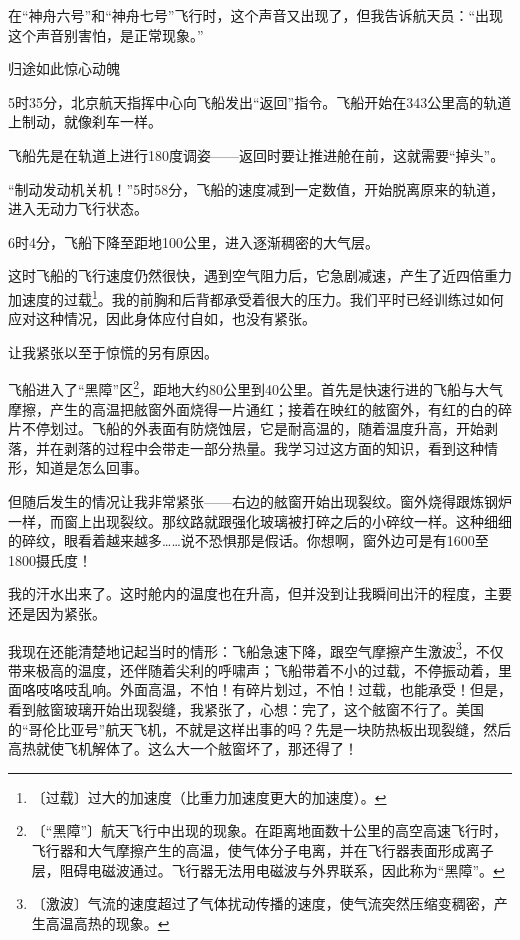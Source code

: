 \documentclass[12pt,UTF-8,openany]{ctexbook}
\begin{document}
\begin{large}
    在“神舟六号”和“神舟七号”飞行时，这个声音又出现了，但我告诉航天员：“出现这个声音别害怕，是正常现象。”
    
    归途如此惊心动魄
    
    5时35分，北京航天指挥中心向飞船发出“返回”指令。飞船开始在343公里高的轨道上制动，就像刹车一样。
    
    飞船先是在轨道上进行180度调姿——返回时要让推进舱在前，这就需要“掉头”。
    
    “制动发动机关机！”5时58分，飞船的速度减到一定数值，开始脱离原来的轨道，进入无动力飞行状态。
    
    6时4分，飞船下降至距地100公里，进入逐渐稠密的大气层。
    
    这时飞船的飞行速度仍然很快，遇到空气阻力后，它急剧减速，产生了近四倍重力加速度的过载\footnote{〔过载〕过大的加速度（比重力加速度更大的加速度）。}。我的前胸和后背都承受着很大的压力。我们平时已经训练过如何应对这种情况，因此身体应付自如，也没有紧张。
    
    让我紧张以至于惊慌的另有原因。
    
    飞船进入了“黑障”区\footnote{〔“黑障”〕航天飞行中出现的现象。在距离地面数十公里的高空高速飞行时，飞行器和大气摩擦产生的高温，使气体分子电离，并在飞行器表面形成离子层，阻碍电磁波通过。飞行器无法用电磁波与外界联系，因此称为“黑障”。}，距地大约80公里到40公里。首先是快速行进的飞船与大气摩擦，产生的高温把舷窗外面烧得一片通红；接着在映红的舷窗外，有红的白的碎片不停划过。飞船的外表面有防烧蚀层，它是耐高温的，随着温度升高，开始剥落，并在剥落的过程中会带走一部分热量。我学习过这方面的知识，看到这种情形，知道是怎么回事。
    
    但随后发生的情况让我非常紧张——右边的舷窗开始出现裂纹。窗外烧得跟炼钢炉一样，而窗上出现裂纹。那纹路就跟强化玻璃被打碎之后的小碎纹一样。这种细细的碎纹，眼看着越来越多……说不恐惧那是假话。你想啊，窗外边可是有1600至1800摄氏度！
    
    我的汗水出来了。这时舱内的温度也在升高，但并没到让我瞬间出汗的程度，主要还是因为紧张。
    
    我现在还能清楚地记起当时的情形：飞船急速下降，跟空气摩擦产生激波\footnote{〔激波〕气流的速度超过了气体扰动传播的速度，使气流突然压缩变稠密，产生高温高热的现象。}，不仅带来极高的温度，还伴随着尖利的呼啸声；飞船带着不小的过载，不停振动着，里面咯吱咯吱乱响。外面高温，不怕！有碎片划过，不怕！过载，也能承受！但是，看到舷窗玻璃开始出现裂缝，我紧张了，心想：完了，这个舷窗不行了。美国的“哥伦比亚号”航天飞机，不就是这样出事的吗？先是一块防热板出现裂缝，然后高热就使飞机解体了。这么大一个舷窗坏了，那还得了！
    

\end{large}
\end{document}
